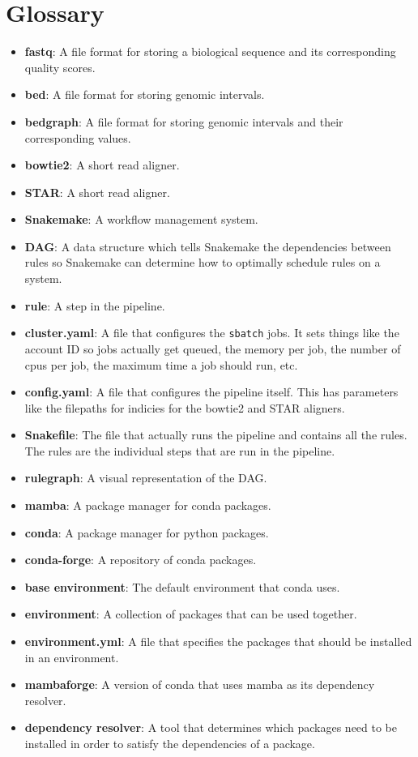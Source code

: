 \documentclass{article}
\begin{document}
    \section{Glossary}
    \begin{itemize}
        \item \textbf{fastq}: A file format for storing a biological sequence and its corresponding quality scores.
        \item \textbf{bed}: A file format for storing genomic intervals. 
        \item \textbf{bedgraph}: A file format for storing genomic intervals and their corresponding values.
        \item \textbf{bowtie2}: A short read aligner.
        \item \textbf{STAR}: A short read aligner.
        \item \textbf{Snakemake}: A workflow management system.
        \item \textbf{DAG}: A data structure which tells Snakemake the dependencies between rules so Snakemake can determine how to optimally schedule rules on a system.
        \item \textbf{rule}: A step in the pipeline.
        \item \textbf{cluster.yaml}: A file that configures the \texttt{sbatch} jobs. It sets things like the account ID so jobs actually get queued, the memory per job, the number of cpus per job, the maximum time a job should run, etc.
        \item \textbf{config.yaml}: A file that configures the pipeline itself. This has parameters like the filepaths for indicies for the bowtie2 and STAR aligners.
        \item \textbf{Snakefile}: The file that actually runs the pipeline and contains all the rules. The rules are the individual steps that are run in the pipeline.
        \item \textbf{rulegraph}: A visual representation of the DAG.
        \item \textbf{mamba}: A package manager for conda packages.
        \item \textbf{conda}: A package manager for python packages.
        \item \textbf{conda-forge}: A repository of conda packages.
        \item \textbf{base environment}: The default environment that conda uses.
        \item \textbf{environment}: A collection of packages that can be used together.
        \item \textbf{environment.yml}: A file that specifies the packages that should be installed in an environment.
        \item \textbf{mambaforge}: A version of conda that uses mamba as its dependency resolver.
        \item \textbf{dependency resolver}: A tool that determines which packages need to be installed in order to satisfy the dependencies of a package.
    \end{itemize}
\end{document}
